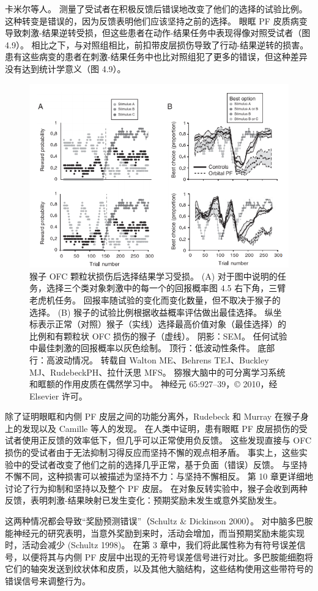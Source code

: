 卡米尔等人。 测量了受试者在积极反馈后错误地改变了他们的选择的试验比例。 这种转变是错误的，因为反馈表明他们应该坚持之前的选择。 眼眶 PF 皮质病变导致刺激-结果逆转受损，但这些患者在动作-结果任务中表现得像对照受试者（图 4.9）。 相比之下，与对照组相比，前扣带皮层损伤导致了行动-结果逆转的损害。 患有这些病变的患者在刺激-结果任务中也比对照组犯了更多的错误，但这种差异没有达到统计学意义（图 4.9）。\par
\begin{figure}[!htb]
	\centering
	\includegraphics{image_pfc/Fig_4_6}
	\caption{猴子 OFC 颗粒状损伤后选择结果学习受损。 (A) 对于图中说明的任务，选择三个类对象刺激中的每一个的回报概率图 4.5 右下角，三臂老虎机任务。 回报率随试验的变化而变化数量，但不取决于猴子的选择。 (B) 猴子的试验比例根据收益概率评估做出最佳选择。 纵坐标表示正常（对照）猴子（实线）选择最高价值对象（最佳选择）的比例和有颗粒状 OFC 损伤的猴子（虚线）。 阴影：SEM。 任何试验中最佳刺激的回报概率以灰色绘制。 顶行：低波动性条件。 底部行：高波动情况。 转载自 Walton ME、Behrens TEJ、Buckley MJ、RudebeckPH、拉什沃思 MFS。 猕猴大脑中的可分离学习系统和眶额的作用皮质在偶然学习中。 神经元 65:927–39，© 2010，经 Elsevier 许可。}
\end{figure}
 除了证明眼眶和内侧 PF 皮层之间的功能分离外，Rudebeck 和 Murray 在猴子身上的发现以及 Camille 等人的发现。 在人类中证明，患有眼眶 PF 皮层损伤的受试者使用正反馈的效率低下，但几乎可以正常使用负反馈。 这些发现直接与 OFC 损伤的受试者由于无法抑制习得反应而坚持不懈的观点相矛盾。 事实上，这些实验中的受试者改变了他们之前的选择几乎正常，基于负面（错误）反馈。 与坚持不懈不同，这种损害可以被描述为坚持不力：与坚持不懈相反。 第 10 章更详细地讨论了行为抑制和坚持以及整个 PF 皮层。
在对象反转实验中，猴子会收到两种反馈，表明刺激-结果映射已发生变化：预期奖励未发生或意外奖励发生。\par 这两种情况都会导致“奖励预测错误”（Schultz \& Dickinson 2000）。 对中脑多巴胺能神经元的研究表明，当意外奖励到来时，活动会增加，而当预期奖励未能实现时，活动会减少 (Schultz 1998)。 在第 3 章中，我们将此属性称为有符号误差信号，以便将其与内侧 PF 皮层中出现的无符号误差信号进行对比。多巴胺能细胞将它们的轴突发送到纹状体和皮质，以及其他大脑结构，这些结构使用这些带符号的错误信号来调整行为。\par
